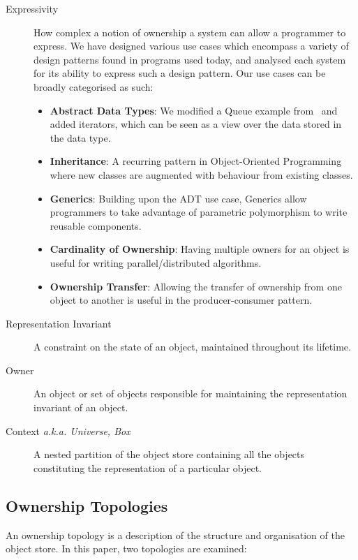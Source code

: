 \documentclass{acm_proc_article-sp}
\begin{document}
\begin{description}
	\item[Expressivity] How complex a notion of ownership a system can allow a
		programmer to express. We have designed various use cases which
		encompass a variety of design patterns found in programs used today, and
		analysed each system for its ability to express such a design pattern.
		Our use cases can be broadly categorised as such:

	\begin{itemize}
		\item \textbf{Abstract Data Types}: We modified a Queue example
			from~\cite{boyapati04safejava} and added iterators, which can be 
			seen as a view over the data stored in the data type.
		\item \textbf{Inheritance}: A recurring pattern in Object-Oriented
			Programming where new classes are augmented with behaviour from 
			existing classes.
		\item \textbf{Generics}: Building upon the ADT use case, Generics
			allow programmers to take advantage of parametric polymorphism to
			write reusable components.
		\item \textbf{Cardinality of Ownership}: Having multiple owners for an
			object is useful for writing parallel/distributed algorithms.
		\item \textbf{Ownership Transfer}: Allowing the transfer of ownership
			from one object to another is useful in the \linebreak 
			producer-consumer pattern.
	\end{itemize}

	\item[Representation Invariant] A constraint on the state of an object,
		maintained throughout its lifetime.
	\item[Owner] An object or set of objects responsible for maintaining the
		representation invariant of an object.
	\item[Context \emph{a.k.a. Universe, Box}] A nested partition of the object
		store containing all the objects constituting the representation of
		a particular object.
\end{description}

\subsection{Ownership Topologies}
\label{subsec:topologies}

An ownership topology is a description of the structure and organisation of the
object store. In this paper, two topologies are examined:
\end{document}
